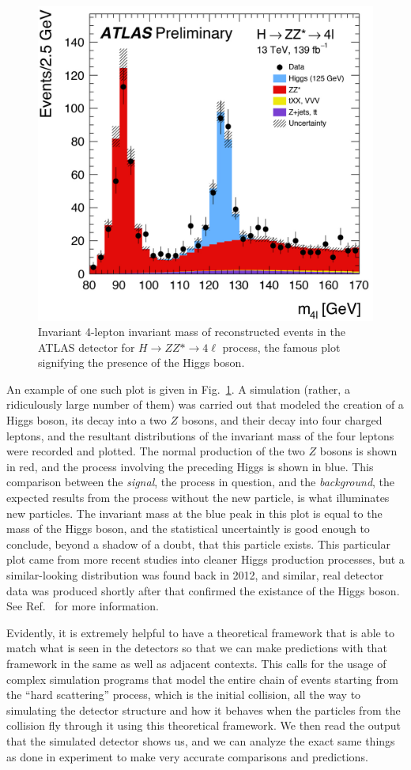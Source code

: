 \begin{figure}[ht]
  \centering
  \includegraphics[width=0.6\linewidth]{./res/Images/higgs.jpg}
  \caption{Invariant 4-lepton invariant mass of reconstructed events in the ATLAS detector for $H \rightarrow ZZ* \rightarrow 4\ell$ process, the famous plot signifying the presence of the Higgs boson.}
  \label{fig:higgs}
\end{figure}

An example of one such plot is given in Fig.~\ref{fig:higgs}. A simulation (rather, a ridiculously large number of them) was carried out that modeled the creation of a Higgs boson, its decay into a two $Z$ bosons, and their decay into four charged leptons, and the resultant distributions of the invariant mass of the four leptons were recorded and plotted. The normal production of the two $Z$ bosons is shown in red, and the process involving the preceding Higgs is shown in blue. This comparison between the \textit{signal}, the process in question, and the \textit{background}, the expected results from the process without the new particle, is what illuminates new particles. The invariant mass at the blue peak in this plot is equal to the mass of the Higgs boson, and the statistical uncertaintly is good enough to conclude, beyond a shadow of a doubt, that this particle exists. This particular plot came from more recent studies into cleaner Higgs production processes, but a similar-looking distribution was found back in 2012, and similar, real detector data was produced shortly after that confirmed the existance of the Higgs boson. See Ref.~\cite{Aad_2020} for more information.

Evidently, it is extremely helpful to have a theoretical framework that is able to match what is seen in the detectors so that we can make predictions with that framework in the same as well as adjacent contexts. This calls for the usage of complex simulation programs that model the entire chain of events starting from the ``hard scattering'' process, which is the initial collision, all the way to simulating the detector structure and how it behaves when the particles from the collision fly through it using this theoretical framework. We then read the output that the simulated detector shows us, and we can analyze the exact same things as done in experiment to make very accurate comparisons and predictions.

